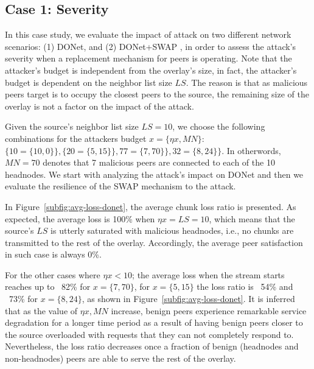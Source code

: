 \subsection{Case 1: \drop Severity}

In this case study, we evaluate the impact of \drop attack on two different network scenarios:  (1) DONet, and (2) DONet+SWAP \cite{nguyen2016swap}, in order to assess the attack's severity when a replacement mechanism for peers is operating.
Note that the attacker's budget is independent from the overlay's size, in fact, the attacker's budget is dependent on the neighbor list size $LS$.
The reason is that as malicious peers target is to occupy the closest peers to the source, the remaining size of the overlay is not a factor on the impact of the \drop attack.

Given the source's neighbor list size $LS=10$, we choose the following combinations for the attackers budget $x={\{\eta x, MN\}}$: $\{10=\{10,0\}\}, \{20=\{5,15\}\}, 77=\{7,70\}\}, 32=\{8,24\}\}$.
In otherwords, $MN=70$ denotes that 7 malicious peers are connected to each of the 10 headnodes.
We start with analyzing the attack's impact on DONet and then we evaluate the resilience of the SWAP mechanism to the attack.

In Figure~\ref{subfig:avg-loss-donet}, the average chunk loss ratio is presented. 
As expected, the average loss is 100\% when $\eta x= LS =10$, which means that the source's $LS$ is utterly saturated with malicious headnodes, i.e., no chunks are transmitted to the rest of the overlay.
Accordingly, the average peer satisfaction in such case is always 0\%. 

For the other cases where $\eta x < 10$; the average loss when the stream starts reaches up to ~82\% for $x=\{7, 70\}$, for $x=\{5, 15\}$ the loss ratio is ~54\% and ~73\% for $x=\{8, 24\}$, as shown in Figure~\ref{subfig:avg-loss-donet}.
It is inferred that as the value of $\eta x, MN$ increase, benign peers experience remarkable service degradation for a longer time period as a result of having benign peers closer to the source overloaded with requests that they can not completely respond to. 
Nevertheless, the loss ratio decreases once a fraction of benign (headnodes and non-headnodes) peers are able to serve the rest of the overlay.

